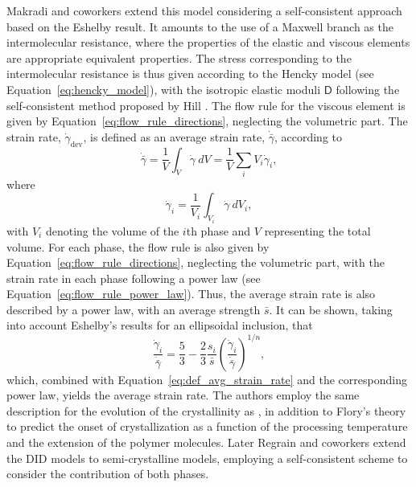 Makradi and coworkers \citep{makradiTwophaseSelfconsistentModel2005} extend this model considering a self-consistent approach based on the Eshelby result.
It amounts to the use of a Maxwell branch as the intermolecular resistance, where the properties of the elastic and viscous elements are appropriate equivalent properties.
The stress corresponding to the intermolecular resistance is thus given according to the Hencky model (see Equation~\eqref{eq:hencky_model}), with the isotropic elastic moduli $\bm{\mathsf D}$ following the self-consistent method proposed by Hill \citep{hillSelfconsistentMechanicsComposite1965}.
The flow rule for the viscous element is given by Equation~\eqref{eq:flow_rule_directions}, neglecting the volumetric part.
The strain rate, $\dot \gamma_\text{dev}$, is defined as an average strain rate, $\dot{\bar\gamma}$, according to
\begin{equation}
	\label{eq:def_avg_strain_rate}
	\dot{\bar\gamma} = \frac{1}{V}\int_V \dot \gamma\ dV = \frac{1}{V}\sum_i V_i \dot{\gamma}_i,
\end{equation}
where
\begin{equation}
	\dot \gamma_i = \frac{1}{V_i}\int_{V_i} \dot \gamma\ dV_i,
\end{equation}
with $V_i$ denoting the volume of the $i$th phase and $V$ representing the total volume.
For each phase, the flow rule is also given by Equation~\eqref{eq:flow_rule_directions}, neglecting the volumetric part, with the strain rate in each phase following a power law (see Equation~\eqref{eq:flow_rule_power_law}).
Thus, the average strain rate is also described by a power law, with an average strength $\bar s$.
It can be shown, taking into account Eshelby's results for an ellipsoidal inclusion, that
\begin{equation}
	\frac{\dot \gamma_i}{\dot{\bar \gamma}} = \frac{5}{3} - \frac{2}{3}\frac{s_i}{\bar s} \left(\frac{\dot \gamma_i}{\dot{\bar \gamma}}\right)^{1/n},
\end{equation}
which, combined with Equation~\eqref{eq:def_avg_strain_rate} and the corresponding power law, yields the average strain rate.
The authors employ the same description for the evolution of the crystallinity as \cite{ahziModelingDeformationBehavior2003}, in addition to Flory's theory to predict the onset of crystallization as a function of the processing temperature and the extension of the polymer molecules.
Later Regrain and coworkers \citep{regrainMultimechanismModelsSemicrystalline2009} extend the DID models to semi-crystalline models, employing a self-consistent scheme to consider the contribution of both phases.

